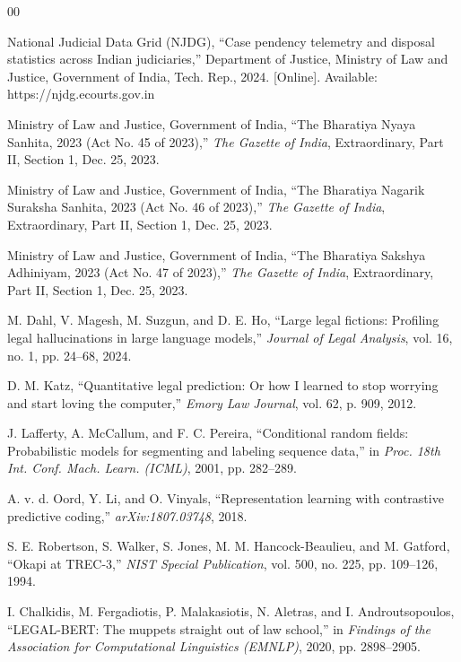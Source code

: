 \documentclass[conference]{IEEEtran}
\begin{document}
\begin{thebibliography}{00}

National Judicial Data Grid (NJDG), ``Case pendency telemetry and disposal statistics across Indian judiciaries,'' Department of Justice, Ministry of Law and Justice, Government of India, Tech. Rep., 2024. [Online]. Available: https://njdg.ecourts.gov.in

Ministry of Law and Justice, Government of India, ``The Bharatiya Nyaya Sanhita, 2023 (Act No. 45 of 2023),'' \textit{The Gazette of India}, Extraordinary, Part II, Section 1, Dec. 25, 2023.

Ministry of Law and Justice, Government of India, ``The Bharatiya Nagarik Suraksha Sanhita, 2023 (Act No. 46 of 2023),'' \textit{The Gazette of India}, Extraordinary, Part II, Section 1, Dec. 25, 2023.

Ministry of Law and Justice, Government of India, ``The Bharatiya Sakshya Adhiniyam, 2023 (Act No. 47 of 2023),'' \textit{The Gazette of India}, Extraordinary, Part II, Section 1, Dec. 25, 2023.

M. Dahl, V. Magesh, M. Suzgun, and D. E. Ho, ``Large legal fictions: Profiling legal hallucinations in large language models,'' \textit{Journal of Legal Analysis}, vol. 16, no. 1, pp. 24--68, 2024.

D. M. Katz, ``Quantitative legal prediction: Or how I learned to stop worrying and start loving the computer,'' \textit{Emory Law Journal}, vol. 62, p. 909, 2012.

J. Lafferty, A. McCallum, and F. C. Pereira, ``Conditional random fields: Probabilistic models for segmenting and labeling sequence data,'' in \textit{Proc. 18th Int. Conf. Mach. Learn. (ICML)}, 2001, pp. 282--289.

A. v. d. Oord, Y. Li, and O. Vinyals, ``Representation learning with contrastive predictive coding,'' \textit{arXiv:1807.03748}, 2018.

S. E. Robertson, S. Walker, S. Jones, M. M. Hancock-Beaulieu, and M. Gatford, ``Okapi at TREC-3,'' \textit{NIST Special Publication}, vol. 500, no. 225, pp. 109--126, 1994.

I. Chalkidis, M. Fergadiotis, P. Malakasiotis, N. Aletras, and I. Androutsopoulos, ``LEGAL-BERT: The muppets straight out of law school,'' in \textit{Findings of the Association for Computational Linguistics (EMNLP)}, 2020, pp. 2898--2905.


\end{thebibliography}
\end{document}

